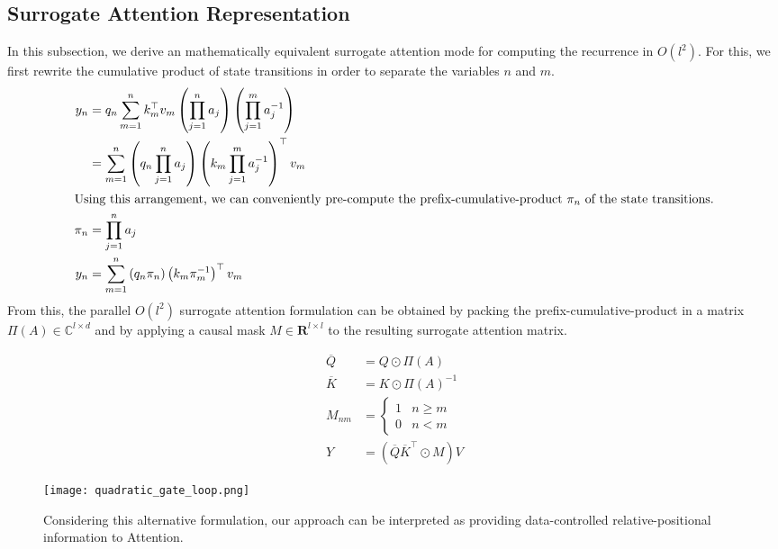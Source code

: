 \documentclass{article} \usepackage{iclr2024_conference,times}
\begin{document}
\subsection{Surrogate Attention Representation}
In this subsection, we derive an mathematically equivalent surrogate attention mode for computing the recurrence in $O(l^2)$. For this, we first rewrite the cumulative product of state transitions in order to separate the variables $n$ and $m$. 
\begin{align}
y_n &= q_n \sum_{m=1}^{n} k_m^\top v_m \left( \prod_{j=1}^{n} a_j \right) \left( \prod_{j=1}^{m} a_j^{-1} \right) \\
&= \sum_{m=1}^{n} \left( q_n \prod_{j=1}^{n} a_j \right) \left( k_m \prod_{j=1}^{m} a_j^{-1} \right)^\top v_m \\
\intertext{Using this arrangement, we can conveniently pre-compute the prefix-cumulative-product $\pi_n$ of the state transitions.}
\pi_n &= \prod_{j=1}^{n} a_j \\
y_n &= \sum_{m=1}^{n} \left( q_n \pi_n \right) \left( k_m \pi_m^{-1} \right)^\top v_m
\end{align}
From this, the parallel $O(l^2)$ surrogate attention formulation can be obtained by packing the prefix-cumulative-product in a matrix $\Pi(A) \in \mathbb{C}^{l \times d}$ and by applying a causal mask $M \in \mathbf{R}^{l \times l}$ to the resulting surrogate attention matrix.
\begin{figure}[H]
  \begin{minipage}{0.6\textwidth}
    \begin{align}
    \overline{Q} &= Q \odot \Pi(A) \\[3pt]
    \overline{K} &= K \odot \Pi(A)^{-1} \\[18pt]
    M_{nm} &= 
    \begin{cases} 
    1 & n \geq m \\
    0 & n < m
    \end{cases} \\[18pt]
    Y &= (\overline{Q} \overline{K}^\top \odot M) V
    \end{align}
  \end{minipage}
  \begin{minipage}{0.4\textwidth}
    \centering
    \texttt{[image: quadratic\_gate\_loop.png]}
  \end{minipage}
  \caption{Considering this alternative formulation, our approach can be interpreted as providing data-controlled relative-positional information to Attention.}
\end{figure}
\end{document}
